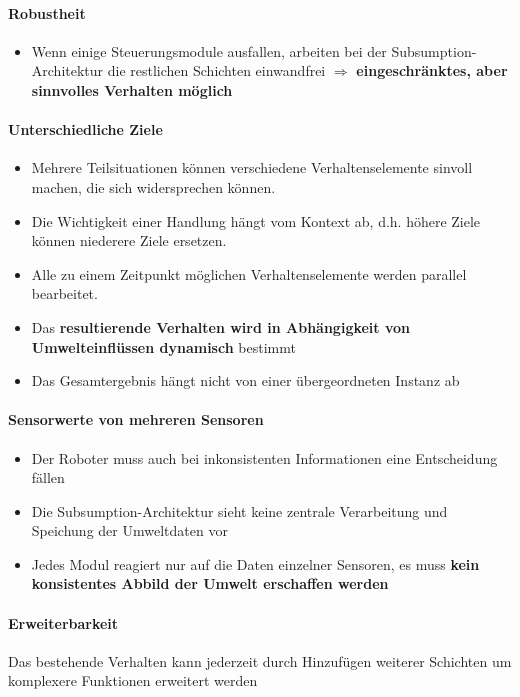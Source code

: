 \paragraph{Robustheit}
\begin{itemize}
	\item Wenn einige Steuerungsmodule ausfallen, arbeiten bei der Subsumption-Architektur die restlichen Schichten einwandfrei $\Rightarrow$ \textbf{eingeschränktes, aber sinnvolles Verhalten möglich}
\end{itemize}
\paragraph{Unterschiedliche Ziele}
\begin{itemize}
	\item Mehrere Teilsituationen können verschiedene Verhaltenselemente sinvoll machen, die sich widersprechen können.
	\item Die Wichtigkeit einer Handlung hängt vom Kontext ab, d.h. höhere Ziele können niederere Ziele ersetzen.
	\item Alle zu einem Zeitpunkt möglichen Verhaltenselemente werden parallel bearbeitet.
	\item Das \textbf{resultierende Verhalten wird in Abhängigkeit von Umwelteinflüssen dynamisch} bestimmt
	\item Das Gesamtergebnis hängt nicht von einer übergeordneten Instanz ab
\end{itemize}
\paragraph{Sensorwerte von mehreren Sensoren}
\begin{itemize}
	\item Der Roboter muss auch bei inkonsistenten Informationen eine Entscheidung fällen
	\item Die Subsumption-Architektur sieht keine zentrale Verarbeitung und Speichung der Umweltdaten vor
	\item Jedes Modul reagiert nur auf die Daten einzelner Sensoren, es muss \textbf{kein konsistentes Abbild der Umwelt erschaffen werden}
\end{itemize}
\paragraph{Erweiterbarkeit}
Das bestehende Verhalten kann jederzeit durch Hinzufügen weiterer Schichten um komplexere Funktionen erweitert werden
